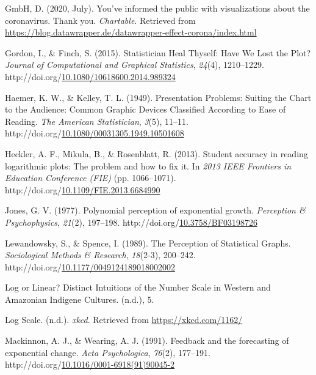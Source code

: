 \documentclass[print]{nuthesis}
\newlength{\cslhangindent}
\newenvironment{CSLReferences}%
{\setlength{\parindent}{0pt}%
\everypar{\setlength{\hangindent}{\cslhangindent}}\ignorespaces}%
{\par}
\begin{document}
\begin{CSLReferences}{1}{0}
\leavevmode\hypertarget{ref-gmbh_youve_2020}{}%
GmbH, D. (2020, July). You've informed the public with visualizations about the coronavirus. {Thank} you. \emph{Chartable}. Retrieved from \url{https://blog.datawrapper.de/datawrapper-effect-corona/index.html}

\leavevmode\hypertarget{ref-gordon_statistician_2015}{}%
Gordon, I., \& Finch, S. (2015). Statistician {Heal} {Thyself}: {Have} {We} {Lost} the {Plot}? \emph{Journal of Computational and Graphical Statistics}, \emph{24}(4), 1210--1229. http://doi.org/\href{https://doi.org/10.1080/10618600.2014.989324}{10.1080/10618600.2014.989324}

\leavevmode\hypertarget{ref-haemer_presentation_1949}{}%
Haemer, K. W., \& Kelley, T. L. (1949). Presentation {Problems}: {Suiting} the {Chart} to the {Audience}: {Common} {Graphic} {Devices} {Classified} {According} to {Ease} of {Reading}. \emph{The American Statistician}, \emph{3}(5), 11--11. http://doi.org/\href{https://doi.org/10.1080/00031305.1949.10501608}{10.1080/00031305.1949.10501608}

\leavevmode\hypertarget{ref-heckler_student_2013}{}%
Heckler, A. F., Mikula, B., \& Rosenblatt, R. (2013). Student accuracy in reading logarithmic plots: {The} problem and how to fix it. In \emph{2013 {IEEE} {Frontiers} in {Education} {Conference} ({FIE})} (pp. 1066--1071). http://doi.org/\href{https://doi.org/10.1109/FIE.2013.6684990}{10.1109/FIE.2013.6684990}

\leavevmode\hypertarget{ref-jones_polynomial_1977}{}%
Jones, G. V. (1977). Polynomial perception of exponential growth. \emph{Perception \& Psychophysics}, \emph{21}(2), 197--198. http://doi.org/\href{https://doi.org/10.3758/BF03198726}{10.3758/BF03198726}

\leavevmode\hypertarget{ref-lewandowsky_perception_1989}{}%
Lewandowsky, S., \& Spence, I. (1989). The {Perception} of {Statistical} {Graphs}. \emph{Sociological Methods \& Research}, \emph{18}(2-3), 200--242. http://doi.org/\href{https://doi.org/10.1177/0049124189018002002}{10.1177/0049124189018002002}

\leavevmode\hypertarget{ref-noauthor_log_nodate}{}%
Log or {Linear}? {Distinct} {Intuitions} of the {Number} {Scale} in {Western} and {Amazonian} {Indigene} {Cultures}. (n.d.), 5.

\leavevmode\hypertarget{ref-noauthor_log_nodate-1}{}%
Log {Scale}. (n.d.). \emph{xkcd}. Retrieved from \url{https://xkcd.com/1162/}

\leavevmode\hypertarget{ref-mackinnon_feedback_1991}{}%
Mackinnon, A. J., \& Wearing, A. J. (1991). Feedback and the forecasting of exponential change. \emph{Acta Psychologica}, \emph{76}(2), 177--191. http://doi.org/\href{https://doi.org/10.1016/0001-6918(91)90045-2}{10.1016/0001-6918(91)90045-2}


\end{CSLReferences}
\end{document}
